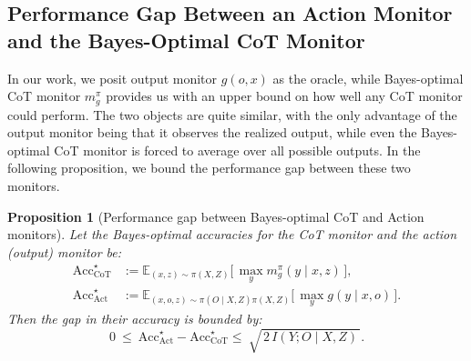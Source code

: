 \documentclass{article}
\theoremstyle{plain}
\newtheorem{proposition}[theorem]{Proposition}
\def\E{\mathbb{E}}
\begin{document}
\subsection{Performance Gap Between an Action Monitor and the Bayes-Optimal CoT Monitor}
\label{appx:gap-action-vs-cot}
In our work, we posit output monitor $g(o,x)$ as the oracle, while Bayes-optimal CoT monitor $m_g^\pi$ provides us with an upper bound on how well any CoT monitor could perform.
The two objects are quite similar, with the only advantage of the output monitor being that it observes the realized output, while even the Bayes-optimal CoT monitor is forced to average over all possible outputs.
In the following proposition, we bound the performance gap between these two monitors.

\begin{proposition}[Performance gap between Bayes-optimal CoT and Action monitors]
\label{prop:bayes-gap-cot-and-action-monitor}
Let the Bayes-optimal accuracies for the CoT monitor and the action (output) monitor be:
\begin{align*}
\mathrm{Acc}^{\star}_{\mathrm{CoT}}
&:= \E_{(x,z)\sim \pi(X,Z)}\!\Big[\,\max_{y} m_g^{\pi}(y\mid x,z)\,\Big], \\
\mathrm{Acc}^{\star}_{\mathrm{Act}}
&:= \E_{(x,o,z)\sim \pi(O\mid X,Z)\pi(X,Z)}\!\Big[\,\max_{y} g(y \mid x,o)\,\Big].
\end{align*}
Then the gap in their accuracy is bounded by:
\begin{equation}
\label{eq:bayes-gap-statement-acc}
0\ \le\ 
\mathrm{Acc}^{\star}_{\mathrm{Act}} - \mathrm{Acc}^{\star}_{\mathrm{CoT}}
 \le\ 
 \sqrt{\,2\,I(Y;O\mid X,Z)\,}.
\end{equation}
\end{proposition}
\end{document}
